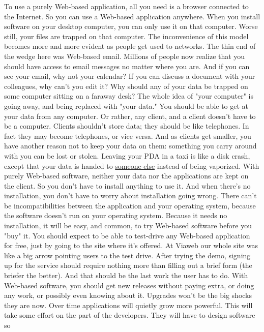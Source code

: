 To use a purely Web-based application, all you need is a browser
connected to the Internet.  So you can use a Web-based application
anywhere.  When you install software on your desktop computer, you
can only use it on that computer.  Worse still, your files are
trapped on that computer.  The inconvenience of this model becomes
more and more evident as people get used to networks.
The thin end of the wedge here was Web-based email.  Millions of
people now realize that you should have access to email messages
no matter where you are.  And if you can see your email, why not
your calendar?  
If you can discuss a document with your colleagues,
why can't you edit it?  Why should any of your data be trapped on
some computer sitting on a faraway desk?
The whole idea of "your computer" is going away, and being replaced
with "your data."  You should be able to get at your data from any
computer.  Or rather, any client, and a client doesn't have to be
a computer.
Clients shouldn't store data; they should be like telephones.  In
fact they may become telephones, or vice versa.  And as clients
get smaller, you have another reason not to keep your data on them:
something you carry around with you can be lost or stolen.   Leaving
your PDA in a taxi is like a disk crash, except that your data is
handed to \href{http://news.zdnet.co.uk/business/0,39020645,2077931,00.htm}{someone else} 
instead of being vaporized.
With purely Web-based software, neither your data nor the applications
are kept on the client.  So you don't have to install anything to
use it.  And when there's no installation, you don't have to worry
about installation going wrong.  There can't be incompatibilities
between the application and your operating system, because the
software doesn't run on your operating system.
Because it needs no installation, it will be easy, and common, to
try Web-based software before you "buy" it.  You should expect to
be able to test-drive any Web-based application for free, just by
going to the site where it's offered.  At Viaweb our whole site
was like a big arrow pointing users to the test drive.
After trying the demo, signing up for the service should require
nothing more than filling out a brief form (the briefer the better).
And that should be the last work the user has to do.  With Web-based
software, you should get new releases without paying extra, or
doing any work, or possibly even knowing about it.
Upgrades won't be the big shocks they are now.  Over time applications
will quietly grow more powerful.  This will take some effort on
the part of the developers.  They will have to design software so
